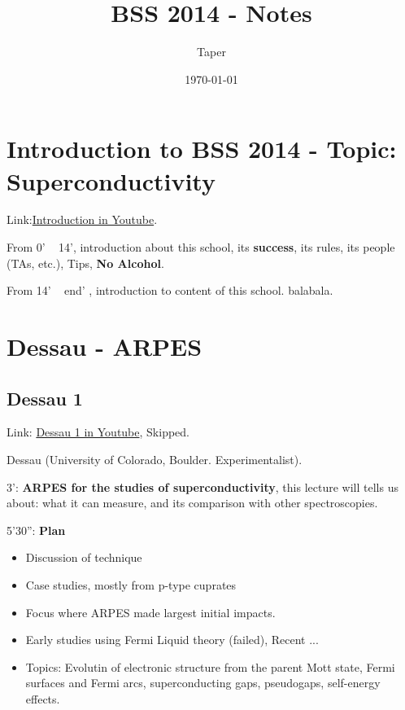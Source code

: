 \documentclass{article}
\title{BSS 2014 - Notes}
\date{\today}
\author{Taper}
\begin{document}
\maketitle
{}
\tableofcontents

\section{Introduction to BSS 2014 - Topic: Superconductivity}
\label{sec:intro}

Link:\href{https://www.youtube.com/watch?v=umVzk0r0tPo&list=PL8mMEmoXNBfajJ15HO5G-PZW_0yWGWBdh&index=1}{Introduction in Youtube}.

From 0' ~ 14', introduction about this school, its \textbf{success},
its rules, its people (TAs, etc.), Tips, \textbf{No Alcohol}.

From 14' ~ end' , introduction to content of this school. balabala.

\section{Dessau - ARPES}
\label{sec:Dessau}

    \subsection{Dessau 1}
    \label{sec:Dessau 1}

    Link:
    \href{https://www.youtube.com/watch?v=g-qlJ9S-BKY&list=PL8mMEmoXNBfajJ15HO5G-PZW_0yWGWBdh&index=2}{Dessau 1 in Youtube}, Skipped.

    Dessau (University of Colorado, Boulder. Experimentalist). 

    3': \textbf{ARPES for the studies of superconductivity}, this lecture
    will tells us about: what it can measure, and its comparison with
    other spectroscopies.

    5'30'': \textbf{Plan}
    \begin{itemize}
        \item Discussion of technique
        \item Case studies, mostly from p-type cuprates
        \item Focus where ARPES made largest initial impacts.
        \item Early studies using Fermi Liquid theory (failed), Recent ...
        \item Topics: Evolutin of electronic structure from the parent
            Mott state, Fermi surfaces and Fermi arcs, superconducting
            gaps, pseudogaps, self-energy effects.
    \end{itemize}
\end{document}
